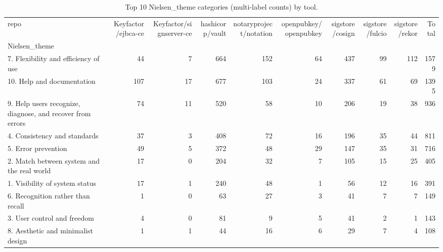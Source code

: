 \begin{table}[t]
\centering
\caption{Top 10 Nielsen_theme categories (multi-label counts) by tool.}
\label{tab:phase3-nielsen_theme}
\scriptsize
\begin{tabular}{lrrrrrrrrr}
\toprule
repo & Keyfactor/ejbca-ce & Keyfactor/signserver-ce & hashicorp/vault & notaryproject/notation & openpubkey/openpubkey & sigstore/cosign & sigstore/fulcio & sigstore/rekor & Total \\
Nielsen_theme &  &  &  &  &  &  &  &  &  \\
\midrule
7. Flexibility and efficiency of use & 44 & 7 & 664 & 152 & 64 & 437 & 99 & 112 & 1579 \\
10. Help and documentation & 107 & 17 & 677 & 103 & 24 & 337 & 61 & 69 & 1395 \\
9. Help users recognize, diagnose, and recover from errors & 74 & 11 & 520 & 58 & 10 & 206 & 19 & 38 & 936 \\
4. Consistency and standards & 37 & 3 & 408 & 72 & 16 & 196 & 35 & 44 & 811 \\
5. Error prevention & 49 & 5 & 372 & 48 & 29 & 147 & 35 & 31 & 716 \\
2. Match between system and the real world & 17 & 0 & 204 & 32 & 7 & 105 & 15 & 25 & 405 \\
1. Visibility of system status & 17 & 1 & 240 & 48 & 1 & 56 & 12 & 16 & 391 \\
6. Recognition rather than recall & 1 & 0 & 63 & 27 & 3 & 41 & 7 & 7 & 149 \\
3. User control and freedom & 4 & 0 & 81 & 9 & 5 & 41 & 2 & 1 & 143 \\
8. Aesthetic and minimalist design & 1 & 1 & 44 & 16 & 6 & 29 & 7 & 4 & 108 \\
\bottomrule
\end{tabular}

\end{table}
